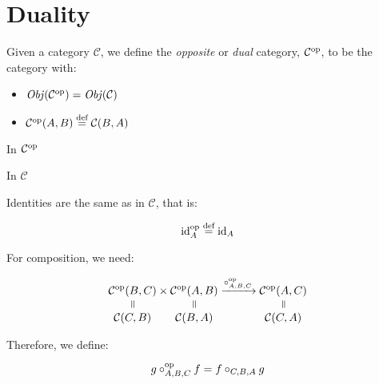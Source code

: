 \section{Duality}
\begin{definition}[Duality]
Given a category $\mathcal{C}$, we define the \emph{opposite} or \emph{dual}
category, $\mathcal{C}^{\mathrm{op}}$, to be the category with:
    \begin{itemize}
        \item $\operatorname{\mathit{Obj}}(\mathcal{C}^{\mathrm{op}}) = \operatorname{\mathit{Obj}}(\mathcal{C})$
        \item $\mathcal{C}^{\mathrm{op}}(A, B) \stackrel{\text{def}}{=} \mathcal{C}(B, A)$
    \end{itemize}

\begin{minipage}[t]{0.49\textwidth}
    \begin{center}
        In $\mathcal{C}^{\mathrm{op}}$

        \vspace{15pt}

    \end{center}
\end{minipage}%
\vline%
\begin{minipage}[t]{0.49\textwidth}
    \begin{center}
        In $\mathcal{C}$

        \vspace{15pt}

    \end{center}
\end{minipage}

Identities are the same as in $\mathcal{C}$, that is:

\begin{equation*}
    \mathrm{id}_{ A }^{\mathrm{op}} \stackrel{\text{def}}{=} \mathrm{id}_{ A }
\end{equation*}

For composition, we need:

\begin{equation*}
    \equalto{\mathcal{C}^{\op}(B, C)}{\mathcal{C}(C, B)} \times
    \equalto{\mathcal{C}^{\op}(A, B)}{\mathcal{C}(B, A)}
    \xrightarrow{\comp^{\op}_{A,B,C}}
    \equalto{\mathcal{C}^{\op}(A, C)}{\mathcal{C}(C, A)}
\end{equation*}

Therefore, we define:

\begin{equation*}
    g \circ^{\mathrm{op}}_{A,B,C} f = f \circ_{C,B,A} g
\end{equation*}
\end{definition}

